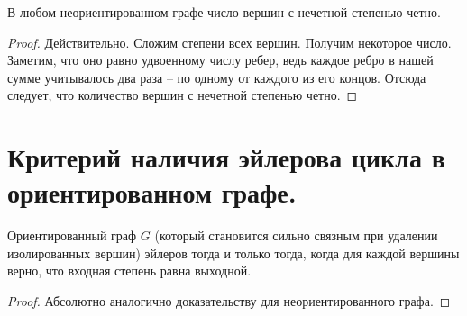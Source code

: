 \begin{theorem}
В любом неориентированном графе число вершин с нечетной степенью четно.
\end{theorem}

\begin{proof}
Действительно. Сложим степени всех вершин. Получим некоторое число. Заметим, что оно равно удвоенному числу ребер, ведь каждое ребро в нашей сумме учитывалось два раза -- по одному от каждого из его концов. Отсюда следует, что количество вершин с нечетной степенью четно.
\end{proof}

\setcounter{section}{42}
\section{Критерий наличия эйлерова цикла в ориентированном графе.}

\begin{theorem}
Ориентированный граф $G$ (который становится сильно связным при удалении изолированных вершин) эйлеров тогда и только тогда, когда для каждой вершины верно, что входная степень равна выходной.
\end{theorem}

\begin{proof}
Абсолютно аналогично доказательству для неориентированного графа.
\end{proof}